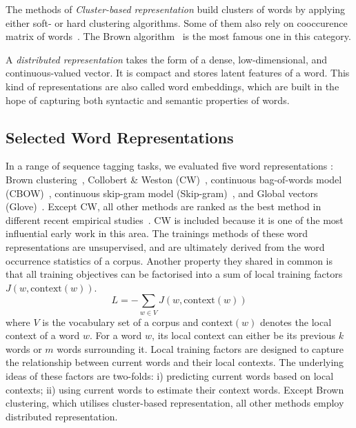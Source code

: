 The methods of \textit{Cluster-based representation} build clusters of words by applying either soft- or hard clustering algorithms. Some of them also rely on cooccurence matrix of words~\cite{}. The Brown algorithm~\cite{} is the most famous one in this category.

A \textit{distributed representation} takes the form of a dense, low-dimensional, and continuous-valued vector. It is compact and stores latent features of a word. This kind of representations are also called word embeddings, which are built in the hope of capturing both syntactic and semantic properties of words.

\subsection{Selected Word Representations}
In a range of sequence tagging tasks, we evaluated five word representations : Brown clustering~\cite{}, Collobert \& Weston (CW)~\cite{}, continuous bag-of-words model (CBOW)~\cite{}, continuous skip-gram model (Skip-gram)~\cite{}, and Global vectors (Glove)~\cite{}. Except CW, all other methods are ranked as the best method in different recent empirical studies~\cite{}. CW is included because it is one of the most influential early work in this area. The trainings methods of these word representations are unsupervised, and are ultimately derived from the word occurrence statistics of a corpus. Another property they shared in common is that all training objectives can be factorised into a sum of local training factors $J(w, \text{context}(w))$. 
\begin{equation}
L = - \sum_{w \in V} J(w, \text{context}(w))
\end{equation}
where $V$ is the vocabulary set of a corpus and $\text{context}(w)$ denotes the local context of a word $w$. For a word $w$, its local context can either be its previous $k$ words or $m$ words surrounding it. Local training factors are designed to capture the relationship between current words and their local contexts. The underlying ideas of these factors are two-folds: i) predicting current words based on local contexts; ii) using current words to estimate their context words. Except Brown clustering, which utilises cluster-based representation, all other methods employ distributed representation.

